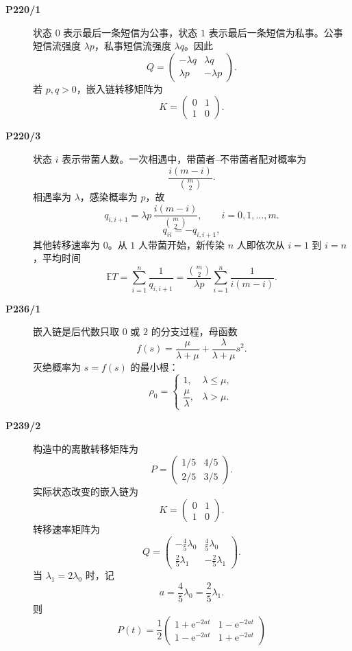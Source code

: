 \documentclass[12pt,a4paper,openany]{ctexrep}
\theoremstyle{definition}
\newcommand{\E}{\mathbb{E}}
\newcommand{\e}{\mathrm{e}}
\begin{document}
\begin{description}
	\item[\textbf{P220/1}]
	状态 $0$ 表示最后一条短信为公事，状态 $1$ 表示最后一条短信为私事。公事短信流强度 $\lambda p$，私事短信流强度 $\lambda q$。因此
	\[
	Q=
	\begin{pmatrix}
	-\lambda q&\lambda q\\
	\lambda p&-\lambda p
	\end{pmatrix}.
	\]
	若 $p,q>0$，嵌入链转移矩阵为
	\[
	K=
	\begin{pmatrix}
	0&1\\
	1&0
	\end{pmatrix}.
	\]
	\item[\textbf{P220/3}]
	状态 $i$ 表示带菌人数。一次相遇中，带菌者--不带菌者配对概率为
	\[
	\frac{i(m-i)}{\binom m2}.
	\]
	相遇率为 $\lambda$，感染概率为 $p$，故
	\[
	q_{i,i+1}=
	\lambda p\,\frac{i(m-i)}{\binom m2},\qquad i=0,1,\dots,m.
	\]
	\[
	q_{ii}=-q_{i,i+1},
	\]
	其他转移速率为 $0$。从 $1$ 人带菌开始，新传染 $n$ 人即依次从 $i=1$ 到 $i=n$，平均时间
	\[
	\E T=
	\sum_{i=1}^{n}\frac1{q_{i,i+1}}
	=
	\frac{\binom m2}{\lambda p}
	\sum_{i=1}^{n}\frac1{i(m-i)}.
	\]
	\item[\textbf{P236/1}]
	嵌入链是后代数只取 $0$ 或 $2$ 的分支过程，母函数
	\[
	f(s)=\frac{\mu}{\lambda+\mu}+
	\frac{\lambda}{\lambda+\mu}s^2.
	\]
	灭绝概率为 $s=f(s)$ 的最小根：
	\[
	\rho_0=
	\begin{cases}
	1,&\lambda\le\mu,\\[1ex]
	\dfrac{\mu}{\lambda},&\lambda>\mu.
	\end{cases}
	\]
	\item[\textbf{P239/2}]
	构造中的离散转移矩阵为
	\[
	P=
	\begin{pmatrix}
	1/5&4/5\\
	2/5&3/5
	\end{pmatrix}.
	\]
	实际状态改变的嵌入链为
	\[
	K=
	\begin{pmatrix}
	0&1\\
	1&0
	\end{pmatrix}.
	\]
	转移速率矩阵为
	\[
	Q=
	\begin{pmatrix}
	-\frac45\lambda_0&\frac45\lambda_0\\[0.5ex]
	\frac25\lambda_1&-\frac25\lambda_1
	\end{pmatrix}.
	\]
	当 $\lambda_1=2\lambda_0$ 时，记
	\[
	a=\frac45\lambda_0=\frac25\lambda_1.
	\]
	则
	\[
	P(t)=
	\frac12
	\begin{pmatrix}
	1+\e^{-2at}&1-\e^{-2at}\\
	1-\e^{-2at}&1+\e^{-2at}

\end{pmatrix}\]
\end{description}
\end{document}
